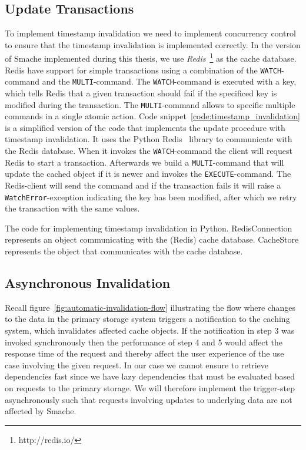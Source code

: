 
\subsection{Update Transactions}
\label{subsec:update-transactions}

To implement timestamp invalidation we need to implement concurrency control to ensure that the timestamp invalidation is implemented correctly. In the version of Smache implemented during this thesis, we use \emph{Redis}~\footnote{http://redis.io/} as the cache database. Redis have support for simple transactions using a combination of the \verb$WATCH$-command and the \verb$MULTI$-command. The \verb$WATCH$-command is executed with a key, which tells Redis that a given transaction should fail if the specificed key is modified during the transaction. The \verb$MULTI$-command allows to specific multiple commands in a single atomic action.
Code snippet~\ref{code:timestamp_invalidation} is a simplified version of the code that implements the update procedure with timestamp invalidation. It uses the Python Redis~\cite{docs:python-redis} library to communicate with the Redis database. When it invokes the \verb$WATCH$-command the client will request Redis to start a transaction. Afterwards we build a \verb$MULTI$-command that will update the cached object if it is newer and invokes the \verb$EXECUTE$-command. The Redis-client will send the command and if the transaction fails it will raise a \verb$WatchError$-exception indicating the key has been modified, after which we retry the transaction with the same values.

\begin{code}{The code for implementing timestamp invalidation in Python. RedisConnection represents an object communicating with the (Redis) cache database. CacheStore represents the object that communicates with the cache database.}
  
  \label{code:timestamp_invalidation}
\end{code}


\subsection{Asynchronous Invalidation}
\label{subsec:asynchronous-invalidation}

Recall figure~\ref{fig:automatic-invalidation-flow} illustrating the flow where changes to the data in the primary storage system triggers a notification to the caching system, which invalidates affected cache objects. If the notification in step 3 was invoked synchronously then the performance of step 4 and 5 would affect the response time of the request and thereby affect the user experience of the use case involving the given request. In our case we cannot ensure to retrieve dependencies fast since we have lazy dependencies that must be evaluated based on requests to the primary storage. We will therefore implement the trigger-step asynchronously such that requests involving updates to underlying data are not affected by Smache.

